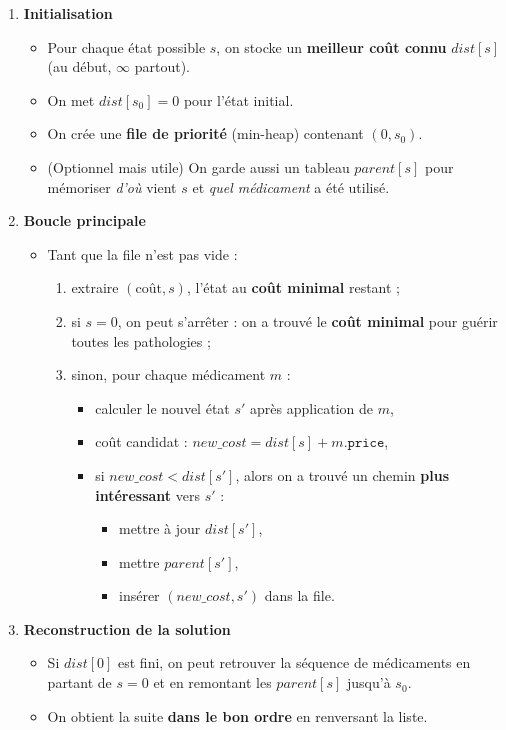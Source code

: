 \begin{enumerate}[leftmargin=1.4em,itemsep=0.4em]
  \item \textbf{Initialisation}
  \begin{itemize}
      \item Pour chaque état possible $s$, on stocke un \textbf{meilleur coût connu} $dist[s]$ (au début, $\infty$ partout).
      \item On met $dist[s_0] = 0$ pour l’état initial.
      \item On crée une \textbf{file de priorité} (min-heap) contenant $(0, s_0)$.
      \item (Optionnel mais utile) On garde aussi un tableau $parent[s]$ pour mémoriser \emph{d’où} vient $s$ et \emph{quel médicament} a été utilisé.
  \end{itemize}

  \item \textbf{Boucle principale}
  \begin{itemize}
      \item Tant que la file n’est pas vide :
      \begin{enumerate}
          \item extraire $(\text{coût}, s)$, l’état au \textbf{coût minimal} restant ;
          \item si $s = 0$, on peut s’arrêter : on a trouvé le \textbf{coût minimal} pour guérir toutes les pathologies ;
          \item sinon, pour chaque médicament $m$ :
          \begin{itemize}
              \item calculer le nouvel état $s'$ après application de $m$,
              \item coût candidat : $new\_cost = dist[s] + m.\texttt{price}$,
              \item si $new\_cost < dist[s']$, alors on a trouvé un chemin \textbf{plus intéressant} vers $s'$ :
              \begin{itemize}
                    \item mettre à jour $dist[s']$,
                    \item mettre $parent[s']$,
                    \item insérer $(new\_cost, s')$ dans la file.
              \end{itemize}
          \end{itemize}
      \end{enumerate}
  \end{itemize}

  \item \textbf{Reconstruction de la solution}
  \begin{itemize}
      \item Si $dist[0]$ est fini, on peut retrouver la séquence de médicaments en partant de $s=0$ et en remontant les $parent[s]$ jusqu’à $s_0$.
      \item On obtient la suite \textbf{dans le bon ordre} en renversant la liste.
  \end{itemize}
\end{enumerate}


